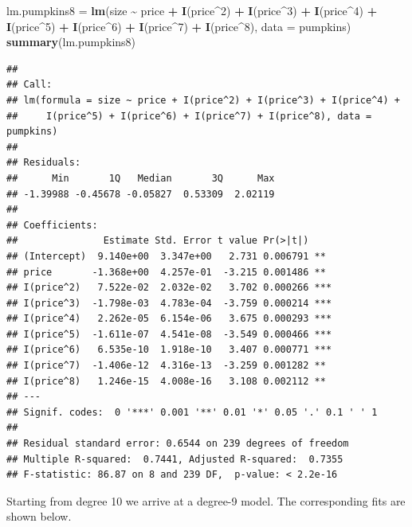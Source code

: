\documentclass[
]{book}
\newenvironment{Shaded}{\begin{snugshade}}{\end{snugshade}}
\newcommand{\AttributeTok}[1]{\textcolor[rgb]{0.13,0.29,0.53}{#1}}
\newcommand{\DecValTok}[1]{\textcolor[rgb]{0.00,0.00,0.81}{#1}}
\newcommand{\FunctionTok}[1]{\textcolor[rgb]{0.13,0.29,0.53}{\textbf{#1}}}
\newcommand{\NormalTok}[1]{#1}
\newcommand{\OtherTok}[1]{\textcolor[rgb]{0.56,0.35,0.01}{#1}}
\newcommand{\SpecialCharTok}[1]{\textcolor[rgb]{0.81,0.36,0.00}{\textbf{#1}}}
\begin{document}
\begin{Shaded}
\begin{Highlighting}[]
\NormalTok{lm.pumpkins8 }\OtherTok{=} \FunctionTok{lm}\NormalTok{(size }\SpecialCharTok{\textasciitilde{}}\NormalTok{ price }\SpecialCharTok{+} \FunctionTok{I}\NormalTok{(price}\SpecialCharTok{\^{}}\DecValTok{2}\NormalTok{) }\SpecialCharTok{+} \FunctionTok{I}\NormalTok{(price}\SpecialCharTok{\^{}}\DecValTok{3}\NormalTok{) }\SpecialCharTok{+} \FunctionTok{I}\NormalTok{(price}\SpecialCharTok{\^{}}\DecValTok{4}\NormalTok{) }\SpecialCharTok{+}
    \FunctionTok{I}\NormalTok{(price}\SpecialCharTok{\^{}}\DecValTok{5}\NormalTok{) }\SpecialCharTok{+} \FunctionTok{I}\NormalTok{(price}\SpecialCharTok{\^{}}\DecValTok{6}\NormalTok{) }\SpecialCharTok{+} \FunctionTok{I}\NormalTok{(price}\SpecialCharTok{\^{}}\DecValTok{7}\NormalTok{) }\SpecialCharTok{+} \FunctionTok{I}\NormalTok{(price}\SpecialCharTok{\^{}}\DecValTok{8}\NormalTok{), }\AttributeTok{data =}\NormalTok{ pumpkins)}
\FunctionTok{summary}\NormalTok{(lm.pumpkins8)}
\end{Highlighting}
\end{Shaded}

\begin{verbatim}
## 
## Call:
## lm(formula = size ~ price + I(price^2) + I(price^3) + I(price^4) + 
##     I(price^5) + I(price^6) + I(price^7) + I(price^8), data = pumpkins)
## 
## Residuals:
##      Min       1Q   Median       3Q      Max 
## -1.39988 -0.45678 -0.05827  0.53309  2.02119 
## 
## Coefficients:
##               Estimate Std. Error t value Pr(>|t|)    
## (Intercept)  9.140e+00  3.347e+00   2.731 0.006791 ** 
## price       -1.368e+00  4.257e-01  -3.215 0.001486 ** 
## I(price^2)   7.522e-02  2.032e-02   3.702 0.000266 ***
## I(price^3)  -1.798e-03  4.783e-04  -3.759 0.000214 ***
## I(price^4)   2.262e-05  6.154e-06   3.675 0.000293 ***
## I(price^5)  -1.611e-07  4.541e-08  -3.549 0.000466 ***
## I(price^6)   6.535e-10  1.918e-10   3.407 0.000771 ***
## I(price^7)  -1.406e-12  4.316e-13  -3.259 0.001282 ** 
## I(price^8)   1.246e-15  4.008e-16   3.108 0.002112 ** 
## ---
## Signif. codes:  0 '***' 0.001 '**' 0.01 '*' 0.05 '.' 0.1 ' ' 1
## 
## Residual standard error: 0.6544 on 239 degrees of freedom
## Multiple R-squared:  0.7441, Adjusted R-squared:  0.7355 
## F-statistic: 86.87 on 8 and 239 DF,  p-value: < 2.2e-16
\end{verbatim}

Starting from degree 10 we arrive at a degree-9 model. The corresponding fits are shown below.
\end{document}
